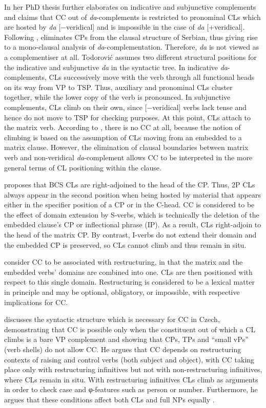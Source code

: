 In her PhD thesis \citet{Todorovic12} further elaborates on indicative and subjunctive complements and claims that CC out of \textit{da}-complements is restricted to pronominal CLs which are hosted by \textit{da} [−veridical] and is impossible in the case of \textit{da} [+veridical]. Following \citet{Progovac05}, \citet{Todorovic12} eliminates CPs from the clausal structure of Serbian, thus giving rise to a mono-clausal analysis of \textit{da}-complementation. Therefore, \textit{da} is not viewed as a complementiser at all. Todorović assumes two different structural positions for the indicative and subjunctive \textit{da} in the syntactic tree. In indicative \textit{da}-complements, CLs successively move with the verb through all functional heads on its way from VP to TSP. Thus, auxiliary and pronominal CLs cluster together, while the lower copy of the verb is pronounced. In subjunctive complements, CLs climb on their own, since [−veridical] verbs lack tense and hence do not move to TSP for checking purposes. At this point, CLs attach to the matrix verb. According to \citet{Todorovic12}, there is no CC at all, because the notion of climbing is based on the assumption of CLs moving from an embedded to a matrix clause. However, the elimination of clausal boundaries between matrix verb and non-veridical \textit{da}-complement allows CC to be interpreted in the more general terms of CL positioning within the clause. 

\citet{Progovac93, Progovac96} proposes that BCS CLs are right-adjoined to the head of the CP. Thus, 2P CLs always appear in the second position when being hosted by material that appears either in the specifier position of a CP or in the C-head. CC is considered to be the effect of domain extension by S-verbs, which is technically the deletion of the embedded clause’s CP or inflectional phrase (IP). As a result, CLs right-adjoin to the head of the matrix CP. By contrast, I-verbs do not extend their domain and the embedded CP is preserved, so CLs cannot climb and thus remain in situ. 

\citet[245]{FranksKing00} consider CC to be associated with restructuring, in that the matrix and the embedded verbs’ domains are combined into one. CLs are then positioned with respect to this single domain. Restructuring is considered to be a lexical matter in principle and may be optional, obligatory, or impossible, with respective implications for CC. 

\citet{Rezac05} discusses the syntactic structure which is necessary for CC in Czech, demonstrating that CC is possible only when the constituent out of which a CL climbs is a bare VP complement and showing that CPs, TPs and “small vPs” (verb shells) do not allow CC. He argues that CC depends on restructuring contexts of raising and control verbs (both subject and object), with CC taking place only with restructuring infinitives but not with non-restructuring infinitives, where CLs remain in situ. With restructuring infinitives CLs climb as arguments in order to check case and φ-features such as person or number. Furthermore, he argues that these conditions affect both CLs and full NPs equally \citep[cf.][]{Rezac05}.

